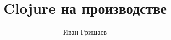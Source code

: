 \documentclass[10pt]{book} %
\author{Иван Гришаев}
\title{Clojure на производстве}
\date{}
\begin{document}






\cleardoublepage
\tableofcontents

\clearpage


\blank
\blank
\blank
\blank
\blank
\blank
\blank

\backmatter


\makeatletter\@openrightfalse\makeatother
\printindex


\end{document}
